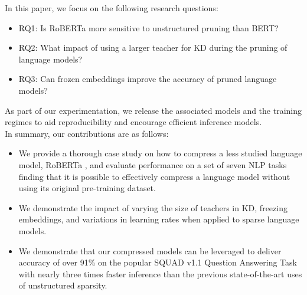 In this paper, we focus on the following research questions: 
\begin{itemize}
    \item RQ1: Is RoBERTa more sensitive to unstructured pruning than BERT?
    \item RQ2: What impact of using a larger teacher for KD during the pruning of language models? 
    \item RQ3: Can frozen embeddings improve the accuracy of pruned language models?
\end{itemize}As part of our experimentation, we release the associated models and the training regimes to aid reproducibility and encourage efficient inference models. \\
In summary, our contributions are as follows:
\begin{itemize}
    \item We provide a thorough case study on how to compress a less studied language model, RoBERTa \cite{Liu2019RoBERTaAR}, and evaluate performance on a set of seven NLP tasks finding that it is possible to effectively compress a language model without using its original pre-training dataset.
    \item We demonstrate the impact of varying the size of teachers in KD, freezing embeddings, and variations in learning rates when applied to sparse language models.
    \item We demonstrate that our compressed models can be leveraged to deliver accuracy of over 91\% on the popular SQUAD v1.1 \cite{Rajpurkar2016SQuAD10} Question Answering Task with nearly three times faster inference than the previous state-of-the-art uses of unstructured sparsity.
\end{itemize} 
